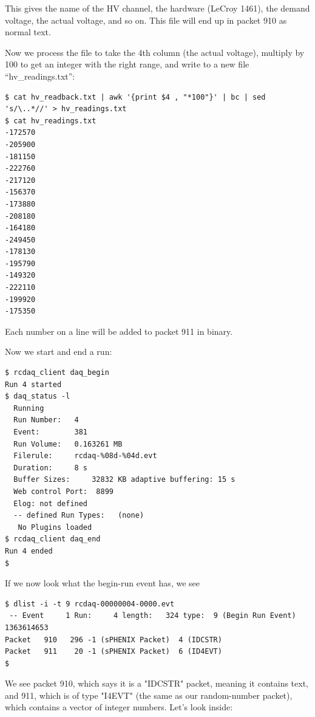 \documentclass{article}[11pt]
\begin{document}
This gives the name of the HV channel, the hardware (LeCroy 1461), the
demand voltage, the actual voltage, and so on. This file will end up
in packet 910 as normal text.

Now we process the file to take the 4th column (the actual voltage),
multiply by 100 to get an integer with the right range, and write to a
new file ``hv\_readings.txt'':

\begin{verbatim}
$ cat hv_readback.txt | awk '{print $4 , "*100"}' | bc | sed 's/\..*//' > hv_readings.txt
$ cat hv_readings.txt
-172570
-205900
-181150
-222760
-217120
-156370
-173880
-208180
-164180
-249450
-178130
-195790
-149320
-222110
-199920
-175350
\end{verbatim}

Each number on a line will be added to packet 911 in binary. 

Now we start and end a run:

\begin{verbatim}
$ rcdaq_client daq_begin
Run 4 started
$ daq_status -l
  Running
  Run Number:   4
  Event:        381
  Run Volume:   0.163261 MB
  Filerule:     rcdaq-%08d-%04d.evt
  Duration:     8 s
  Buffer Sizes:     32832 KB adaptive buffering: 15 s
  Web control Port:  8899
  Elog: not defined
  -- defined Run Types:   (none)
   No Plugins loaded
$ rcdaq_client daq_end
Run 4 ended
$ 
\end{verbatim}

If we now look what the begin-run event has, we see

\begin{verbatim}
$ dlist -i -t 9 rcdaq-00000004-0000.evt
 -- Event     1 Run:     4 length:   324 type:  9 (Begin Run Event)  1363614653
Packet   910   296 -1 (sPHENIX Packet)  4 (IDCSTR)
Packet   911    20 -1 (sPHENIX Packet)  6 (ID4EVT)
$
\end{verbatim}

We see packet 910, which says it is a "IDCSTR" packet, meaning it
contains text, and 911, which is of type "I4EVT" (the same as our
random-number packet), which contains a vector of integer
numbers. Let's look inside:
\end{document}
